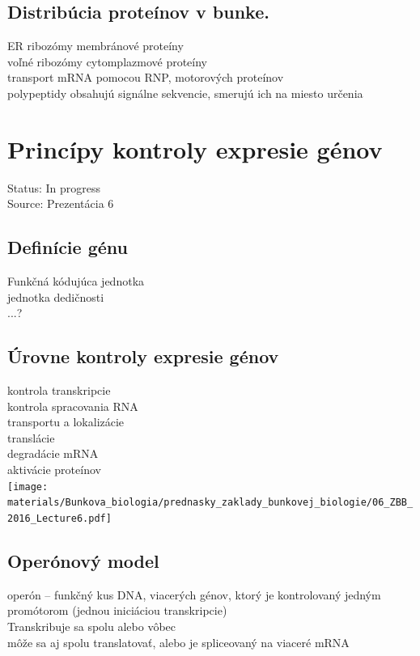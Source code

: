 \subsection{Distribúcia proteínov v bunke.}
ER ribozómy \ra membránové proteíny\\
voľné ribozómy \ra cytomplazmové proteíny\\
transport mRNA pomocou RNP, motorových proteínov\\
polypeptidy obsahujú signálne sekvencie, smerujú ich na miesto určenia\\

\section{Princípy kontroly expresie génov}

Status: In progress\\
Source: Prezentácia 6\\

\subsection{Definície génu}
Funkčná kódujúca jednotka\\
jednotka dedičnosti\\
...?\\
\subsection{Úrovne kontroly expresie génov}
kontrola transkripcie\\
kontrola spracovania RNA\\
transportu a lokalizácie\\
translácie\\
degradácie mRNA\\
aktivácie proteínov\\
\texttt{[image: materials/Bunkova\_biologia/prednasky\_zaklady\_bunkovej\_biologie/06\_ZBB\_2016\_Lecture6.pdf]}\\
\subsection{Operónový model}
operón -- funkčný kus DNA, viacerých génov, ktorý je kontrolovaný jedným promótorom (jednou iniciáciou transkripcie)\\
Transkribuje sa spolu alebo vôbec\\
môže sa aj spolu translatovať, alebo je spliceovaný na viaceré mRNA\\
